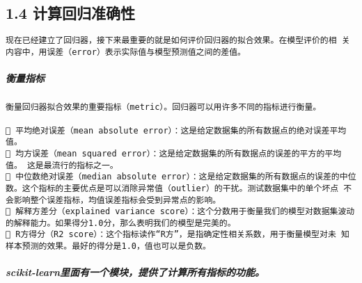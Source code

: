 \documentclass[11pt]{article}
\begin{document}
    \begin{center}
    \end{center}
    { \hspace*{\fill} \\}
    
    \begin{center}
    \end{center}
    { \hspace*{\fill} \\}
    
    \subsection{1.4
计算回归准确性}\label{ux8ba1ux7b97ux56deux5f52ux51c6ux786eux6027}

\begin{verbatim}
现在已经建立了回归器，接下来最重要的就是如何评价回归器的拟合效果。在模型评价的相 关内容中，用误差（error）表示实际值与模型预测值之间的差值。 
\end{verbatim}

    \subparagraph{衡量指标}\label{ux8861ux91cfux6307ux6807}

\begin{verbatim}
衡量回归器拟合效果的重要指标（metric）。回归器可以用许多不同的指标进行衡量。

 平均绝对误差（mean absolute error）：这是给定数据集的所有数据点的绝对误差平均 值。 
 均方误差（mean squared error）：这是给定数据集的所有数据点的误差的平方的平均值。 这是最流行的指标之一。
 中位数绝对误差（median absolute error）：这是给定数据集的所有数据点的误差的中位 数。这个指标的主要优点是可以消除异常值（outlier）的干扰。测试数据集中的单个坏点 不会影响整个误差指标，均值误差指标会受到异常点的影响。 
 解释方差分（explained variance score）：这个分数用于衡量我们的模型对数据集波动 的解释能力。如果得分1.0分，那么表明我们的模型是完美的。 
 R方得分（R2 score）：这个指标读作“R方”，是指确定性相关系数，用于衡量模型对未 知样本预测的效果。最好的得分是1.0，值也可以是负数。 
\end{verbatim}

    \subparagraph{scikit-learn里面有一个模块，提供了计算所有指标的功能。}\label{scikit-learnux91ccux9762ux6709ux4e00ux4e2aux6a21ux5757ux63d0ux4f9bux4e86ux8ba1ux7b97ux6240ux6709ux6307ux6807ux7684ux529fux80fd}
\end{document}

